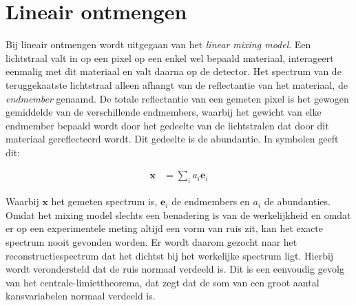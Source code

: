 \documentclass[12pt]{report}
\begin{document}




\section{Lineair ontmengen}

Bij lineair ontmengen wordt uitgegaan van het \textit{linear mixing model}. Een lichtstraal valt in op een pixel op een enkel wel bepaald materiaal, interageert eenmalig met dit materiaal en valt daarna op de detector. Het spectrum van de teruggekaatste lichtstraal alleen afhangt van de reflectantie van het materiaal, de \textit{endmember} genaamd. De totale reflectantie van een gemeten pixel is het gewogen gemiddelde van de verschillende endmembers, waarbij het gewicht van elke endmember bepaald wordt door het gedeelte van de lichtstralen dat door dit materiaal gereflecteerd wordt. Dit gedeelte is de abundantie. In symbolen geeft dit:




\begin{align}
\bm{x} &= \sum_i a_i \bm{e}_i \label{eq:nq}
\end{align}

Waarbij $\bm{x}$ het gemeten spectrum is, $\bm{e}_i$ de endmembers en $a_i$ de abundanties. Omdat het mixing model slechts een benadering is van de werkelijkheid en omdat er op een experimentele meting altijd een vorm van ruis zit, kan het exacte spectrum nooit gevonden worden. Er wordt daarom gezocht naar het reconstructiespectrum dat het dichtst bij het werkelijke spectrum ligt. Hierbij wordt verondersteld dat de ruis normaal verdeeld is. Dit is een eenvoudig gevolg van het centrale-limiettheorema, dat zegt dat de som van een groot aantal kansvariabelen normaal verdeeld is. 
\end{document}
